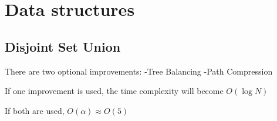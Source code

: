 \chapter{Data structures}

\section{Disjoint Set Union}

    There are two optional improvements:
        -Tree Balancing 
        -Path Compression

    If one improvement is used, 
    the time complexity will become $O(\log{N})$

    If both are used, $O(\alpha) \approx O(5)$

